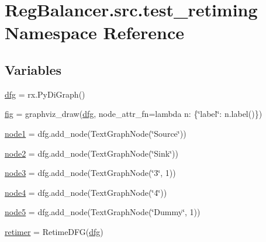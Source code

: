 \hypertarget{namespaceRegBalancer_1_1src_1_1test__retiming}{}\section{Reg\+Balancer.\+src.\+test\+\_\+retiming Namespace Reference}
\label{namespaceRegBalancer_1_1src_1_1test__retiming}
\subsection*{Variables}
\begin{DoxyCompactItemize}
\item 
\hyperlink{namespaceRegBalancer_1_1src_1_1test__retiming_a8d509c28896865f8640f328f30f15721}{dfg} = rx.\+Py\+Di\+Graph()
\item 
\hyperlink{namespaceRegBalancer_1_1src_1_1test__retiming_a64aa603bc3c6c1587e7c6542452481ac}{fig} = graphviz\+\_\+draw(\hyperlink{namespaceRegBalancer_1_1src_1_1test__retiming_a8d509c28896865f8640f328f30f15721}{dfg}, node\+\_\+attr\+\_\+fn=lambda n\+: \{\char`\"{}label\char`\"{}\+: n.\+label()\})
\item 
\hyperlink{namespaceRegBalancer_1_1src_1_1test__retiming_a9932f6d3a67f65e538d7ae56541a85da}{node1} = dfg.\+add\+\_\+node(Text\+Graph\+Node(\char`\"{}Source\char`\"{}))
\item 
\hyperlink{namespaceRegBalancer_1_1src_1_1test__retiming_a6f72570c732db7d8ffbb64f7eef9dea3}{node2} = dfg.\+add\+\_\+node(Text\+Graph\+Node(\char`\"{}Sink\char`\"{}))
\item 
\hyperlink{namespaceRegBalancer_1_1src_1_1test__retiming_a18dee1ca5dda5195c4e2e7f663a3a1dd}{node3} = dfg.\+add\+\_\+node(Text\+Graph\+Node(\char`\"{}3\char`\"{}, 1))
\item 
\hyperlink{namespaceRegBalancer_1_1src_1_1test__retiming_a5a06a6e27e760a838df9849e283cdb4c}{node4} = dfg.\+add\+\_\+node(Text\+Graph\+Node(\char`\"{}4\char`\"{}))
\item 
\hyperlink{namespaceRegBalancer_1_1src_1_1test__retiming_ae47890d9ef0dda045dc2824bd221ff36}{node5} = dfg.\+add\+\_\+node(Text\+Graph\+Node(\char`\"{}Dummy\char`\"{}, 1))
\item 
\hyperlink{namespaceRegBalancer_1_1src_1_1test__retiming_a1209559bbc0dbee87e2e3044b791a287}{retimer} = Retime\+D\+FG(\hyperlink{namespaceRegBalancer_1_1src_1_1test__retiming_a8d509c28896865f8640f328f30f15721}{dfg})
\end{DoxyCompactItemize}


